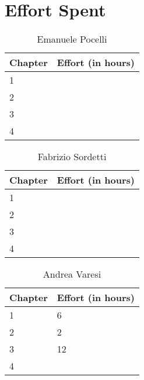 \section{Effort Spent}


\begin{table}[h]
  \centering
  \caption*{Emanuele Pocelli}
  \begin{tabularx}{\textwidth}{|X|X|}
    \hline
    \textbf{Chapter} & \textbf{Effort (in hours)}\\
    \hline
    1 & \\
    \hline
    2 & \\
    \hline
    3 & \\
    \hline 
    4 & \\
    \hline
  \end{tabularx}
\end{table}

\begin{table}[h]
  \centering
  \caption*{Fabrizio Sordetti}
  \begin{tabularx}{\textwidth}{|X|X|}
    \hline
    \textbf{Chapter} & \textbf{Effort (in hours)}\\
    \hline
    1 & \\
    \hline
    2 & \\
    \hline
    3 & \\
    \hline 
    4 & \\
    \hline
  \end{tabularx}
\end{table}

\begin{table}[h]
  \centering
  \caption*{Andrea Varesi}
  \begin{tabularx}{\textwidth}{|X|X|}
    \hline
    \textbf{Chapter} & \textbf{Effort (in hours)}\\
    \hline
    1 & 6\\
    \hline
    2 & 2\\
    \hline
    3 & 12\\
    \hline 
    4 & \\
    \hline
  \end{tabularx}
\end{table}
